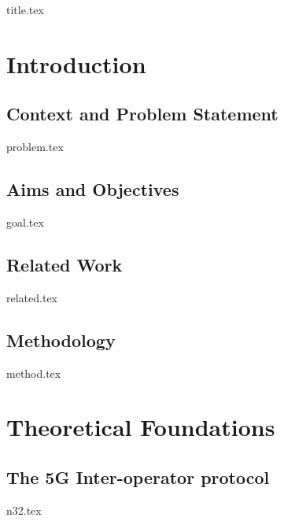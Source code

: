 \documentclass[a4paper,12pt,twoside]{report}
\begin{document}
{title.tex}
\pagestyle{empty}
\clearpage

{}
\pagestyle{plain}
\setcounter{page}{3}
\setcounter{tocdepth}{2}
\tableofcontents

\clearpage

\listoffigures

\listoftables

\printglossary

\printglossary[type=\acronymtype,title=Acronyms]

\chapter{Introduction}
\label{chap:intro}

\section{Context and Problem Statement}
\label{sec:problem}
{problem.tex}

\section{Aims and Objectives}
\label{sec:goal}
{goal.tex}

\section{Related Work}
\label{sec:related}
{related.tex}

\section{Methodology}
\label{sec:method}
{method.tex}

\clearpage

\chapter{Theoretical Foundations}
\label{chap:theory}

\section{The 5G Inter-operator protocol}
\label{sec:n32}
{n32.tex}
\end{document}
